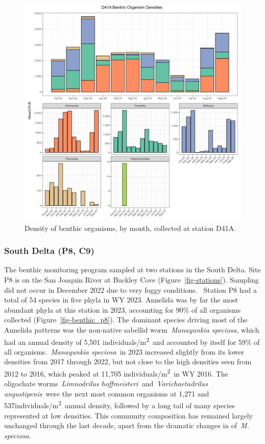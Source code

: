 \documentclass[
]{article}
\begin{document}
\begin{figure}

{\centering \includegraphics[width=9.84in,height=\textheight]{../figures/benthic_bar_d41a.jpg}

}

\caption{\label{fig-benthic_d41a}Density of benthic organisms, by month,
collected at station D41A.}

\end{figure}

\hypertarget{south-delta-p8-c9}{%
\subsubsection{South Delta (P8, C9)}\label{south-delta-p8-c9}}

The benthic monitoring program sampled at two stations in the South
Delta. Site P8 is on the San Joaquin River at Buckley Cove
(Figure~\ref{fig-stations}). Sampling did not occur in December 2022 due
to very foggy conditions.~ Station P8 had a total of 54 species in five
phyla in WY 2023. Annelida was by far the most abundant phyla at this
station in 2023, accounting for 90\% of all organisms collected
(Figure~\ref{fig-benthic_p8}). The dominant species driving most of the
Annelida patterns was the non-native sabellid worm~\emph{Manayunkia
speciosa}, which had an annual density of 5,501
individuals/m\textsuperscript{2}~and accounted by itself for 59\% of all
organisms.~\emph{Manayunkia speciosa}~in 2023 increased slightly from
its lower densities from 2017 through 2022, but not close to the high
densities seen from 2012 to 2016, which peaked at 11,705
individuals/m\textsuperscript{2}~in WY 2016. The oligochate
worms~\emph{Limnodrilus hoffmeisteri}~and~\emph{Varichaetadrilus
angustipenis}~were the next most common organisms at 1,271 and
537individuals/m\textsuperscript{2}~annual density, followed by a long
tail of many species represented at low densities. This community
composition has remained largely unchanged through the last decade,
apart from the dramatic changes in of~\emph{M. speciosa}.
\end{document}
